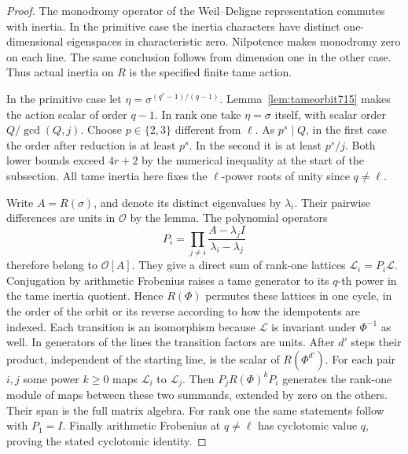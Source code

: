 \documentclass[a4paper,11pt]{article}
\theoremstyle{definition}
\theoremstyle{remark}
\numberwithin{equation}{section}
\begin{document}
\begin{proof}
The monodromy operator of the Weil--Deligne representation
commutes with inertia. In the primitive case the inertia
characters have distinct one-dimensional eigenspaces in
characteristic zero. Nilpotence makes monodromy zero on each
line. The same conclusion follows from dimension one in the
other case. Thus actual inertia on \(R\) is the specified
finite tame action.

In the primitive case let \(\eta=\sigma^{(q^r-1)/(q-1)}\).
Lemma~\ref{lem:tameorbit715} makes the action scalar of order
\(q-1\). In rank one take \(\eta=\sigma\) itself, with scalar
order \(Q/\gcd(Q,j)\). Choose \(p\in\{2,3\}\) different from
\(\ell\). As \(p^s\mid Q\), in the first case the order after
reduction is at least \(p^s\). In the second it is at least
\(p^s/j\). Both lower bounds exceed \(4r+2\) by the numerical
inequality at the start of the subsection. All tame inertia
here fixes the \(\ell\)-power roots of unity since \(q\ne\ell\).

Write \(A=R(\sigma)\), and denote its distinct eigenvalues
by \(\lambda_i\). Their pairwise differences are units in
\(\mathcal O\) by the lemma. The polynomial operators
\[
       P_i=\prod_{j\ne i}\frac{A-\lambda_j I}{\lambda_i-\lambda_j}
\]
therefore belong to \(\mathcal O[A]\). They give a direct sum
of rank-one lattices \(\mathcal L_i=P_i\mathcal L\).
Conjugation by arithmetic Frobenius raises a tame generator
to its \(q\)-th power in the tame inertia quotient. Hence
\(R(\Phi)\) permutes these lattices in one cycle, in the
order of the orbit or its reverse according to how the
idempotents are indexed. Each transition is an isomorphism
because \(\mathcal L\) is invariant under \(\Phi^{-1}\) as
well. In generators of the lines the transition factors are
units. After \(d'\) steps their product, independent of the
starting line, is the scalar of \(R(\Phi^{d'})\). For each
pair \(i,j\) some power \(k\ge0\) maps \(\mathcal L_i\) to
\(\mathcal L_j\). Then \(P_jR(\Phi)^kP_i\) generates the
rank-one module of maps between these two summands, extended
by zero on the others. Their span is the full matrix algebra.
For rank one the same statements follow with \(P_1=I\).
Finally arithmetic Frobenius at \(q\ne\ell\) has cyclotomic
value \(q\), proving the stated cyclotomic identity.
\end{proof}
\end{document}
